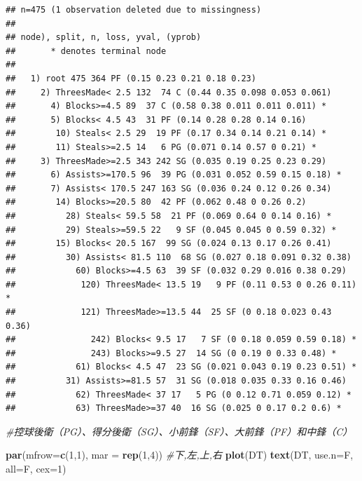 \documentclass[]{book}
\newenvironment{Shaded}{\begin{snugshade}}{\end{snugshade}}
\newcommand{\CommentTok}[1]{\textcolor[rgb]{0.56,0.35,0.01}{\textit{#1}}}
\newcommand{\DataTypeTok}[1]{\textcolor[rgb]{0.13,0.29,0.53}{#1}}
\newcommand{\DecValTok}[1]{\textcolor[rgb]{0.00,0.00,0.81}{#1}}
\newcommand{\KeywordTok}[1]{\textcolor[rgb]{0.13,0.29,0.53}{\textbf{#1}}}
\newcommand{\NormalTok}[1]{#1}
\begin{document}
\begin{verbatim}
## n=475 (1 observation deleted due to missingness)
## 
## node), split, n, loss, yval, (yprob)
##       * denotes terminal node
## 
##   1) root 475 364 PF (0.15 0.23 0.21 0.18 0.23)  
##     2) ThreesMade< 2.5 132  74 C (0.44 0.35 0.098 0.053 0.061)  
##       4) Blocks>=4.5 89  37 C (0.58 0.38 0.011 0.011 0.011) *
##       5) Blocks< 4.5 43  31 PF (0.14 0.28 0.28 0.14 0.16)  
##        10) Steals< 2.5 29  19 PF (0.17 0.34 0.14 0.21 0.14) *
##        11) Steals>=2.5 14   6 PG (0.071 0.14 0.57 0 0.21) *
##     3) ThreesMade>=2.5 343 242 SG (0.035 0.19 0.25 0.23 0.29)  
##       6) Assists>=170.5 96  39 PG (0.031 0.052 0.59 0.15 0.18) *
##       7) Assists< 170.5 247 163 SG (0.036 0.24 0.12 0.26 0.34)  
##        14) Blocks>=20.5 80  42 PF (0.062 0.48 0 0.26 0.2)  
##          28) Steals< 59.5 58  21 PF (0.069 0.64 0 0.14 0.16) *
##          29) Steals>=59.5 22   9 SF (0.045 0.045 0 0.59 0.32) *
##        15) Blocks< 20.5 167  99 SG (0.024 0.13 0.17 0.26 0.41)  
##          30) Assists< 81.5 110  68 SG (0.027 0.18 0.091 0.32 0.38)  
##            60) Blocks>=4.5 63  39 SF (0.032 0.29 0.016 0.38 0.29)  
##             120) ThreesMade< 13.5 19   9 PF (0.11 0.53 0 0.26 0.11) *
##             121) ThreesMade>=13.5 44  25 SF (0 0.18 0.023 0.43 0.36)  
##               242) Blocks< 9.5 17   7 SF (0 0.18 0.059 0.59 0.18) *
##               243) Blocks>=9.5 27  14 SG (0 0.19 0 0.33 0.48) *
##            61) Blocks< 4.5 47  23 SG (0.021 0.043 0.19 0.23 0.51) *
##          31) Assists>=81.5 57  31 SG (0.018 0.035 0.33 0.16 0.46)  
##            62) ThreesMade< 37 17   5 PG (0 0.12 0.71 0.059 0.12) *
##            63) ThreesMade>=37 40  16 SG (0.025 0 0.17 0.2 0.6) *
\end{verbatim}

\begin{Shaded}
\begin{Highlighting}[]
\CommentTok{#控球後衛（PG）、得分後衛（SG）、小前鋒（SF）、大前鋒（PF）和中鋒（C）}
\end{Highlighting}
\end{Shaded}

\begin{Shaded}
\begin{Highlighting}[]
\KeywordTok{par}\NormalTok{(}\DataTypeTok{mfrow=}\KeywordTok{c}\NormalTok{(}\DecValTok{1}\NormalTok{,}\DecValTok{1}\NormalTok{), }\DataTypeTok{mar =} \KeywordTok{rep}\NormalTok{(}\DecValTok{1}\NormalTok{,}\DecValTok{4}\NormalTok{)) }\CommentTok{#下,左,上,右}
\KeywordTok{plot}\NormalTok{(DT)}
\KeywordTok{text}\NormalTok{(DT, }\DataTypeTok{use.n=}\NormalTok{F, }\DataTypeTok{all=}\NormalTok{F, }\DataTypeTok{cex=}\DecValTok{1}\NormalTok{)}
\end{Highlighting}
\end{Shaded}
\end{document}
